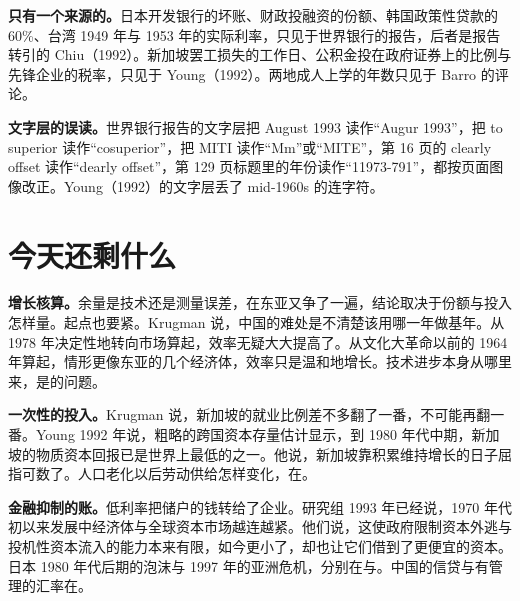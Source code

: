 \begin{deeper}[史料说明]
\textbf{只有一个来源的。}日本开发银行的坏账、财政投融资的份额、韩国政策性贷款的 60\%、台湾 1949 年与 1953 年的实际利率，只见于世界银行的报告，后者是报告转引的 Chiu（1992）。新加坡罢工损失的工作日、公积金投在政府证券上的比例与先锋企业的税率，只见于 Young（1992）。两地成人上学的年数只见于 Barro 的评论。

\textbf{文字层的误读。}世界银行报告的文字层把 August 1993 读作“Augur 1993”，把 to superior 读作“cosuperior”，把 MITI 读作“Mm”或“MITE”，第 16 页的 clearly offset 读作“dearly offset”，第 129 页标题里的年份读作“11973-791”，都按页面图像改正。Young（1992）的文字层丢了 mid-1960s 的连字符。
\end{deeper}

\section{今天还剩什么}\label{sec:eastasia-legacy}

\textbf{增长核算。}余量是技术还是测量误差，在东亚又争了一遍，结论取决于份额与投入怎样量。起点也要紧。Krugman 说，中国的难处是不清楚该用哪一年做基年\cite{krugman1994}。从 1978 年决定性地转向市场算起，效率无疑大大提高了\cite{krugman1994}。从文化大革命以前的 1964 年算起，情形更像东亚的几个经济体，效率只是温和地增长\cite{krugman1994}。技术进步本身从哪里来，是的问题。

\textbf{一次性的投入。}Krugman 说，新加坡的就业比例差不多翻了一番，不可能再翻一番\cite{krugman1994}。Young 1992 年说，粗略的跨国资本存量估计显示，到 1980 年代中期，新加坡的物质资本回报已是世界上最低的之一\cite{young1992}。他说，新加坡靠积累维持增长的日子屈指可数了\cite{young1992}。人口老化以后劳动供给怎样变化，在。

\textbf{金融抑制的账。}低利率把储户的钱转给了企业。研究组 1993 年已经说，1970 年代初以来发展中经济体与全球资本市场越连越紧\cite{worldbank1993}。他们说，这使政府限制资本外逃与投机性资本流入的能力本来有限，如今更小了，却也让它们借到了更便宜的资本\cite{worldbank1993}。日本 1980 年代后期的泡沫与 1997 年的亚洲危机，分别在与。中国的信贷与有管理的汇率在。

